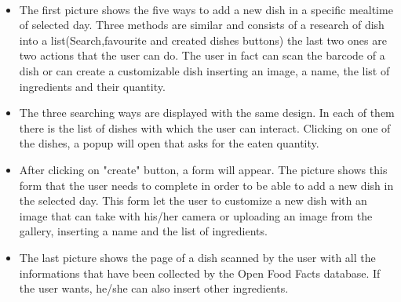 \documentclass [12pt]{article}
\begin{document}
\begin{description}[leftmargin=1cm,rightmargin=1cm]
\begin{figure}[h!]
\begin{subfigure}[tr]{0.3\linewidth}
\end{subfigure}
\hspace*{\fill}
\end{figure}
\\
\begin{itemize}[•]
\item The first picture shows the five  ways to add a new dish in a specific mealtime of selected day. Three methods are similar and consists of a research of dish into a list(Search,favourite and created dishes buttons) the last two ones are two actions that the user can do. The user in fact can scan the barcode of a dish or can create a customizable dish inserting an image, a name, the list of ingredients and their quantity. 
\item The three searching ways are displayed with the same design. In each of them there is the list of dishes with which the user can interact. Clicking on one of the dishes, a popup will open that asks for the eaten quantity.
\item After clicking on "create" button, a form will appear. The picture shows this form that the user needs to complete in order to be able to add a new dish in the selected day.  This form let the user to customize a new dish with an image that can take with his/her camera or uploading an image from the  gallery, inserting a name and the list of ingredients.
\item The last picture shows the page of a dish scanned by the user with all the informations that have been collected by the Open Food Facts database. If the user wants, he/she can also insert other ingredients.
\end{itemize}


\end{description}
\end{document}
